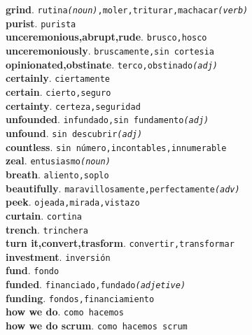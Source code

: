 \documentclass[twocolumn]{article}
\begin{document}
	\textsf{\textbf{grind}}. \texttt{rutina{\scriptsize \textsl{(noun)}},moler,triturar,machacar{\scriptsize \textsl{(verb)}}}\\
	\textsf{\textbf{purist}}. \texttt{purista}\\
	\textsf{\textbf{unceremonious,abrupt,rude}}. \texttt{brusco,hosco}\\
	\textsf{\textbf{unceremoniously}}. \texttt{bruscamente,sin cortesia}\\
	\textsf{\textbf{opinionated,obstinate}}. \texttt{terco,obstinado{\scriptsize \textsl{(adj)}}}\\
	\textsf{\textbf{certainly}}. \texttt{ciertamente}\\
	\textsf{\textbf{certain}}. \texttt{cierto,seguro}\\
	\textsf{\textbf{certainty}}. \texttt{certeza,seguridad}\\
	\textsf{\textbf{unfounded}}. \texttt{infundado,sin fundamento{\scriptsize \textsl{(adj)}}}\\
	\textsf{\textbf{unfound}}. \texttt{sin descubrir{\scriptsize \textsl{(adj)}}}\\
	\textsf{\textbf{countless}}. \texttt{sin número,incontables,innumerable}\\
	\textsf{\textbf{zeal}}. \texttt{entusiasmo{\scriptsize \textsl{(noun)}}}\\
	\textsf{\textbf{breath}}. \texttt{aliento,soplo}\\
	\textsf{\textbf{beautifully}}. \texttt{maravillosamente,perfectamente{\scriptsize \textsl{(adv)}}}\\
	\textsf{\textbf{peek}}. \texttt{ojeada,mirada,vistazo}\\
	\textsf{\textbf{curtain}}. \texttt{cortina}\\
	\textsf{\textbf{trench}}. \texttt{trinchera}\\
	\textsf{\textbf{turn it,convert,trasform}}. \texttt{convertir,transformar}\\
	\textsf{\textbf{investment}}. \texttt{inversi\'on}\\
	\textsf{\textbf{fund}}. \texttt{fondo}\\
	\textsf{\textbf{funded}}. \texttt{financiado,fundado{\scriptsize \textsl{(adjetive)}}}\\
	\textsf{\textbf{funding}}. \texttt{fondos,financiamiento}\\
	\textsf{\textbf{how we do}}. \texttt{como hacemos}\\
	\textsf{\textbf{how we do scrum}}. \texttt{como hacemos scrum}\\
\end{document}
